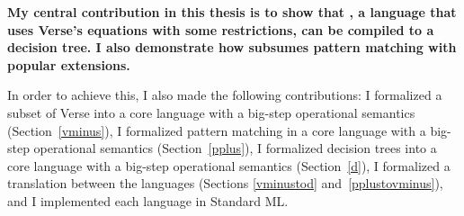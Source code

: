\documentclass[manuscript,screen,review, 12pt, nonacm]{acmart}
\begin{document}
\bf{My central contribution in this thesis} is to show that \VMinus, a language
that uses Verse's equations with some restrictions, can be compiled to a
decision tree. I also demonstrate how \VMinus subsumes pattern matching with
popular extensions. 

In order to achieve this, I also made the following contributions: I formalized
a subset of Verse into a core language \VMinus with a big-step operational
semantics (Section~\ref{vminus}), I formalized pattern matching in a core
language \PPlus with a big-step operational semantics (Section~\ref{pplus}), I
formalized decision trees into a core language \D with a big-step operational
semantics (Section~\ref{d}), I formalized a translation between the languages
(Sections \ref{vminustod} and~\ref{pplustovminus}), and I implemented each
language in Standard ML. 
\end{document}
